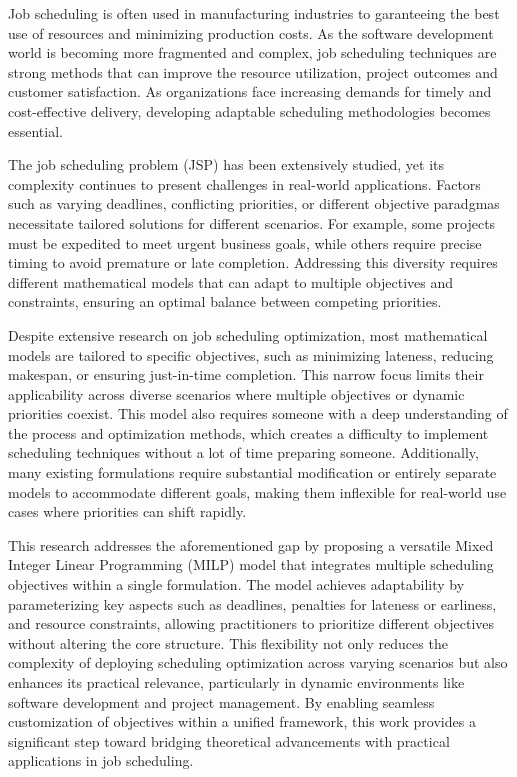\documentclass[12pt]{article}
\begin{document}
Job scheduling is often used in manufacturing industries to garanteeing the best use of resources and minimizing production costs. As the software development world is becoming more fragmented and complex, job scheduling techniques are strong methods that can improve the resource utilization, project outcomes and customer satisfaction. As organizations face increasing demands for timely and cost-effective delivery, developing adaptable scheduling methodologies becomes essential.

The job scheduling problem (JSP) has been extensively studied, yet its complexity continues to present challenges in real-world applications. Factors such as varying deadlines, conflicting priorities, or different objective paradgmas necessitate tailored solutions for different scenarios. For example, some projects must be expedited to meet urgent business goals, while others require precise timing to avoid premature or late completion. Addressing this diversity requires different mathematical models that can adapt to multiple objectives and constraints, ensuring an optimal balance between competing priorities.

Despite extensive research on job scheduling optimization, most mathematical models are tailored to specific objectives, such as minimizing lateness, reducing makespan, or ensuring just-in-time completion. This narrow focus limits their applicability across diverse scenarios where multiple objectives or dynamic priorities coexist. This model also requires someone with a deep understanding of the process and optimization methods, which creates a difficulty to implement scheduling techniques without a lot of time preparing someone. Additionally, many existing formulations require substantial modification or entirely separate models to accommodate different goals, making them inflexible for real-world use cases where priorities can shift rapidly. 

This research addresses the aforementioned gap by proposing a versatile Mixed Integer Linear Programming (MILP) model that integrates multiple scheduling objectives within a single formulation. The model achieves adaptability by parameterizing key aspects such as deadlines, penalties for lateness or earliness, and resource constraints, allowing practitioners to prioritize different objectives without altering the core structure. This flexibility not only reduces the complexity of deploying scheduling optimization across varying scenarios but also enhances its practical relevance, particularly in dynamic environments like software development and project management. By enabling seamless customization of objectives within a unified framework, this work provides a significant step toward bridging theoretical advancements with practical applications in job scheduling.
\end{document}
